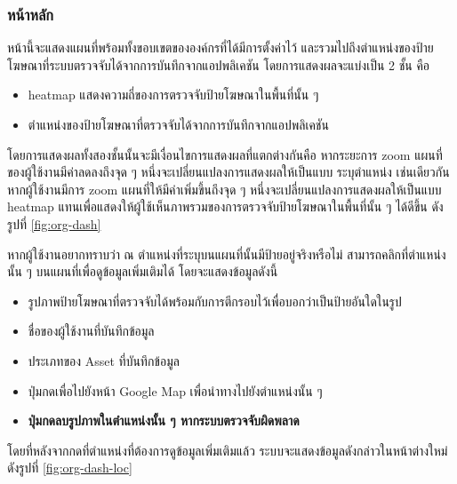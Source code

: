 \subsubsection{หน้าหลัก}
\ifenglish \else
หน้านี้จะแสดงแผนที่พร้อมทั้งขอบเขตขององค์กรที่ได้มีการตั้งค่าไว้ และรวมไปถึงตำแหน่งของป้ายโฆษณาที่ระบบตรวจจับได้จากการบันทึกจากแอปพลิเคชัน โดยการแสดงผลจะแบ่งเป็น 2 ชั้น คือ
\begin{itemize}
    \item heatmap แสดงความถี่ของการตรวจจับป้ายโฆษณาในพื้นที่นั้น ๆ
    \item ตำแหน่งของป้ายโฆษณาที่ตรวจจับได้จากการบันทึกจากแอปพลิเคชัน
\end{itemize}
โดยการแสดงผลทั้งสองชั้นนั้นจะมีเงื่อนไขการแสดงผลที่แตกต่างกันคือ หากระยะการ zoom แผนที่ของผู้ใช้งานมีค่าลดลงถึงจุด ๆ หนึ่งจะเปลี่ยนแปลงการแสดงผลให้เป็นแบบ ระบุตำแหน่ง เช่นเดียวกันหากผู้ใช้งานมีการ zoom แผนที่ให้มีค่าเพิ่มขึ้นถึงจุด ๆ หนึ่งจะเปลี่ยนแปลงการแสดงผลให้เป็นแบบ heatmap แทนเพื่อแสดงให้ผู้ใช้เห็นภาพรวมของการตรวจจับป้ายโฆษณาในพื้นที่นั้น ๆ ได้ดีขึ้น ดังรูปที่ \ref{fig:org-dash}

หากผู้ใช้งานอยากทราบว่า ณ ตำแหน่งที่ระบุบนแผนที่นั้นมีป้ายอยู่จริงหรือไม่ สามารถคลิกที่ตำแหน่งนั้น ๆ บนแผนที่เพื่อดูข้อมูลเพิ่มเติมได้ โดยจะแสดงข้อมูลดังนี้
\begin{itemize}
    \item รูปภาพป้ายโฆษณาที่ตรวจจับได้พร้อมกับการตีกรอบไว้เพื่อบอกว่าเป็นป้ายอันใดในรูป
    \item ชื่อของผู้ใช้งานที่บันทึกข้อมูล
    \item ประเภทของ Asset ที่บันทึกข้อมูล
    \item ปุ่มกดเพื่อไปยังหน้า Google Map เพื่อนำทางไปยังตำแหน่งนั้น ๆ
    \item \textbf{ปุ่มกดลบรูปภาพในตำแหน่งนั้น ๆ หากระบบตรวจจับผิดพลาด}
\end{itemize}
โดยที่หลังจากกดที่ตำแหน่งที่ต้องการดูข้อมูลเพิ่มเติมแล้ว ระบบจะแสดงข้อมูลดังกล่าวในหน้าต่างใหม่ ดังรูปที่ \ref{fig:org-dash-loc}
\fi

